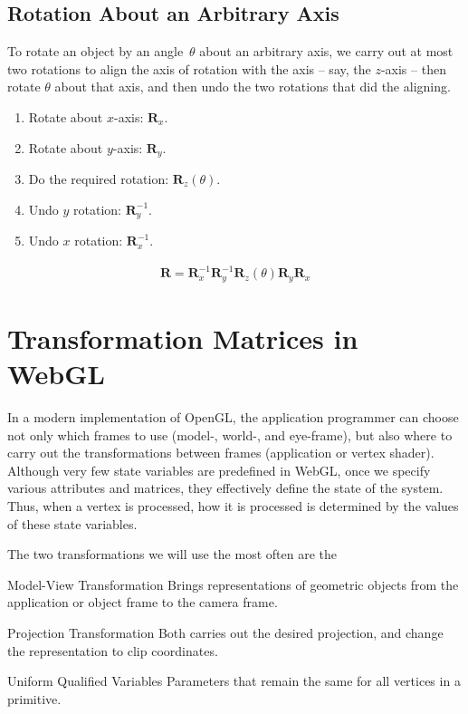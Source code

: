 \documentclass[../COS3712_Notes.tex]{subfiles}
\begin{document}
      \subsection{Rotation About an Arbitrary Axis}
        To rotate an object by an angle~$\theta$ about an arbitrary axis, we carry out at most
        two rotations to align the axis of rotation with the axis -- say, the $z$-axis --
        then rotate $\theta$ about that axis, and then undo the two rotations that
        did the aligning.

        \begin{enumerate}[nosep]
          \item Rotate about $x$-axis: $\mathbf{R}_x$.
          \item Rotate about $y$-axis: $\mathbf{R}_y$.
          \item Do the required rotation: $\mathbf{R}_z(\theta)$.
          \item Undo $y$ rotation: $\mathbf{R}^{-1}_y$.
          \item Undo $x$ rotation: $\mathbf{R}^{-1}_x$.
        \end{enumerate}
        \begin{align*}
          \mathbf{R} = \mathbf{R}^{-1}_x \mathbf{R}^{-1}_y \mathbf{R}_z(\theta) \mathbf{R}_y \mathbf{R}_x
        \end{align*}

    \section{Transformation Matrices in WebGL}
      In a modern implementation of OpenGL, the application programmer can choose not only
      which frames to use
      (model-, world-, and eye-frame),
      but also where to carry out the transformations between frames
      (application or vertex shader).
      Although very few state variables are predefined in WebGL, once we specify various
      attributes and matrices, they effectively define the state of the system.
      Thus, when a vertex is processed, how it is processed is determined by the values
      of these state variables.

      The two transformations we will use the most often are the
      \begin{descriptimize}
        \item[Model-View Transformation] Brings representations of geometric objects
          from the application or object frame to the camera frame.
        \item[Projection Transformation] Both carries out the desired projection,
          and change the representation to clip coordinates.
      \end{descriptimize}

      \begin{definition}{Uniform Qualified Variables}
        Parameters that remain the same for all vertices in a primitive.
      \end{definition}

\end{document}
